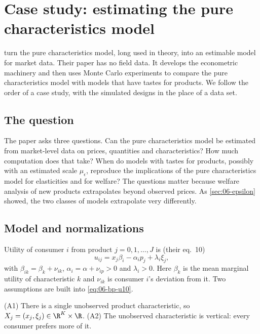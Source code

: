 \section{Case study: estimating the pure characteristics model}\label{sec:06-purechar}

\citet{BerryPakes2007} turn the pure characteristics model, long used in theory, into an estimable model for market
data. Their paper has no field data. It develops the econometric machinery and then uses Monte Carlo experiments to
compare the pure characteristics model with models that have tastes for products. We follow the order of a case study,
with the simulated designs in the place of a data set.

\subsection{The question}\label{sec:06-bp-question}

The paper asks three questions. Can the pure characteristics model be estimated from market-level data on prices,
quantities and characteristics? How much computation does that take? When do models with tastes for products, possibly
with an estimated scale $\mu_\epsilon$, reproduce the implications of the pure characteristics model for elasticities and
for welfare? The questions matter because welfare analysis of new products extrapolates beyond observed prices. As
\cref{sec:06-epsilon} showed, the two classes of models extrapolate very differently.

\subsection{Model and normalizations}\label{sec:06-bp-model}

Utility of consumer $i$ from product $j = 0, 1, \dots, J$ is (their eq.~10)
\begin{equation}\label{eq:06-bp-u10}
  u_{ij} = x_j \beta_i - \alpha_i p_j + \lambda_i \xi_j ,
\end{equation}
with $\beta_{ik} = \beta_k + \nu_{ik}$, $\alpha_i = \alpha + \nu_{ip} > 0$ and $\lambda_i > 0$. Here $\beta_k$ is the mean
marginal utility of characteristic $k$ and $\nu_{ik}$ is consumer $i$'s deviation from it. Two assumptions are built into
\eqref{eq:06-bp-u10}.

\begin{assumption}\label{ass:06-bp}
(A1) There is a single unobserved product characteristic, so $X_j = (x_j, \xi_j) \in \R^K \times \R$. (A2) The unobserved
characteristic is vertical: every consumer prefers more of it.
\end{assumption}

